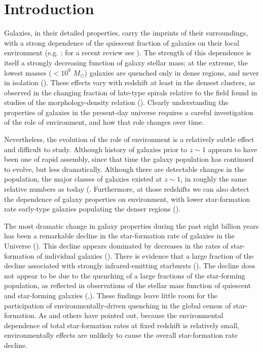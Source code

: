\documentclass{emulateapj}
\begin{document}
\section{Introduction}
Galaxies, in their detailed properties, carry the imprints of their
surroundings, with a strong dependence of the quiescent fraction of
galaxies on their local environment (e.g. \citealt{hubble36a,
oemler74a, dressler80a, hermit96a, guzzo97a}; for a recent review see
\citealt{blanton09a}).  The strength of this dependence is itself a
strongly decreasing function of galaxy stellar mass; at the extreme,
the lowest masses ($<10^{9}$ $M_\odot$) galaxies are quenched only in
dense regions, and never in isolation (\citealt{geha12a}).  These
effects vary with redshift at least in the densest clusters, as
observed in the changing fraction of late-type spirals relative to the
field found in studies of the morphology-density relation
(\citealt{dressler84a, desai07a}).  Clearly understanding the
properties of galaxies in the present-day universe requires a careful
investigation of the role of environment, and how that role changes
over time.

Nevertheless, the evolution of the role of environment is a relatively
subtle effect and difficult to study.  Although history of galaxies
prior to $z\sim 1$ appears to have been one of rapid assembly, since
that time the galaxy population has continued to evolve, but less
dramatically. Although there are detectable changes in the population,
the major classes of galaxies existed at $z\sim 1$, in roughly the
same relative numbers as today (\citealt{bundy06a, borch06a,
taylor09a, moustakas13a}. Furthermore, at those redshifts we can also
detect the dependence of galaxy properties on environment, with lower
star-formation rate early-type galaxies populating the denser regions
(\citealt{cooper08a, patel09a, kovac10a}).

The most dramatic change in galaxy properties during the past eight
billion years has been a remarkable decline in the star-formation rate
of galaxies in the Universe (\citealt{hopkins06a}).  This decline
appears dominated by decreases in the rates of star-formation of
individual galaxies (\cite{Noeske:2007aa}). There is evidence that a
large fraction of the decline associated with strongly
infrared-emitting starbursts (\citealt{bell05a, magnelli09a}).  The
decline does not appear to be due to the quenching of a large
fractions of the star-forming population, as reflected in observations
of the stellar mass function of quiescent and star-forming galaxies
(\cite{Blanton:2006aa},\citealt{bundy06a, borch06a, moustakas13a}).  These
findings leave little room for the participation of
environmentally-driven quenching in the global census of
star-formation.  As \citet{cooper08a} and others have pointed out,
because the environmental dependence of total star-formation rates at
fixed redshift is relatively small, environmentally effects are
unlikely to cause the overall star-formation rate decline.
\end{document}
